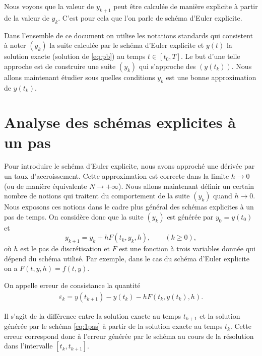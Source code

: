 \documentclass[12pt,a4paper,twoside]{article}
\begin{document}
Nous voyons que la valeur de $y_{k+1}$ peut \^etre calcul\'ee de mani\`ere explicite 
\`a partir de la valeur de $y_k$. C'est pour cela que l'on parle de sch\'ema
d'Euler explicite.


Dans l'ensemble de ce document on utilise les notations standards qui consistent
\`a noter $(y_k)$ la suite calcul\'ee par le sch\'ema d'Euler explicite
et $y(t)$ la solution exacte (solution de \eqref{eq:pb}) au temps $t \in [t_0,T]$.
Le but d'une telle approche est de construire une suite $(y_k)$ qui s'approche
des $(y(t_k))$. Nous allons maintenant \'etudier sous quelles conditions
$y_k$ est une bonne approximation de $y(t_k)$.


\section{Analyse des sch\'emas explicites \`a un pas}

Pour introduire le sch\'ema d'Euler explicite, nous avons approch\'e une d\'eriv\'ee
par un taux d'accroissement. Cette approximation est correcte dans la limite
$h \to 0$ (ou de mani\`ere \'equivalente $N \to +\infty$). 
Nous allons maintenant d\'efinir un certain nombre de notions qui traitent 
du comportement de la suite $(y_k)$ quand $h \to 0$.
Nous exposons ces notions dans le cadre plus g\'en\'eral 
des sch\'emas explicites \`a un pas de temps.
On consid\`ere donc que la suite $(y_k)$ est g\'en\'er\'ee
par $y_0 = y(t_0)$ et
\begin{equation}
  \label{eq:1pas}
  y_{k+1} = y_k + h F(t_k,y_k,h) , \qquad (k \geq 0),
\end{equation}
o\`u $h$ est le pas de discr\'etisation et $F$ est une fonction \`a trois variables
donn\'ee qui d\'epend du sch\'ema utilis\'e.
Par exemple, dans le cas du sch\'ema d'Euler explicite on a $F(t,y,h) = f(t,y)$.


\begin{definition}
  On appelle erreur de consistance la quantit\'e
  \begin{align*}
    \varepsilon_k = y(t_{k+1}) - y(t_k) - h F(t_k , y(t_k) , h ) .
  \end{align*}
\end{definition}
Il s'agit de la diff\'erence entre la solution exacte au temps $t_{k+1}$
et la solution g\'en\'er\'ee par le sch\'ema \eqref{eq:1pas}
\`a partir de la solution exacte au temps $t_k$.
Cette erreur correspond donc \`a l'erreur g\'en\'er\'ee
par le sch\'ema au cours de la r\'esolution dans l'intervalle
$[t_k , t_{k+1}]$.
\end{document}
